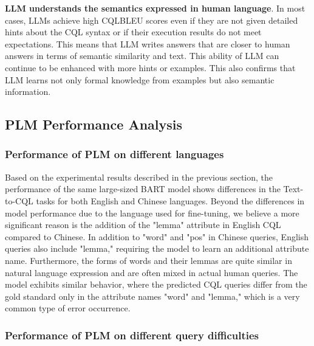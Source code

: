 \documentclass[11pt]{article}
\begin{document}
\begin{CJK*}{UTF8}{gbsn}
\textbf{LLM understands the semantics expressed in human language}. In most cases, LLMs achieve high CQLBLEU scores even if they are not given detailed hints about the CQL syntax or if their execution results do not meet expectations. This means that LLM writes answers that are closer to human answers in terms of semantic similarity and text. This ability of LLM can continue to be enhanced with more hints or examples. This also confirms that LLM learns not only formal knowledge from examples but also semantic information.

\subsection{PLM Performance Analysis}

\subsubsection{Performance of PLM on different languages}
Based on the experimental results described in the previous section, the performance of the same large-sized BART model shows differences in the Text-to-CQL tasks for both English and Chinese languages. Beyond the differences in model performance due to the language used for fine-tuning, we believe a more significant reason is the addition of the "lemma" attribute in English CQL compared to Chinese. In addition to "word" and "pos" in Chinese queries, English queries also include "lemma," requiring the model to learn an additional attribute name. Furthermore, the forms of words and their lemmas are quite similar in natural language expression and are often mixed in actual human queries. The model exhibits similar behavior, where the predicted CQL queries differ from the gold standard only in the attribute names "word" and "lemma," which is a very common type of error occurrence.

\subsubsection{Performance of PLM on different query difficulties}


\end{CJK*}
\end{document}
